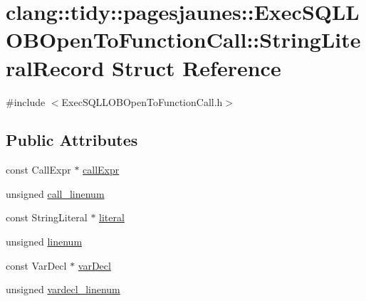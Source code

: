 \hypertarget{structclang_1_1tidy_1_1pagesjaunes_1_1_exec_s_q_l_l_o_b_open_to_function_call_1_1_string_literal_record}{}\section{clang\+:\+:tidy\+:\+:pagesjaunes\+:\+:Exec\+S\+Q\+L\+L\+O\+B\+Open\+To\+Function\+Call\+:\+:String\+Literal\+Record Struct Reference}
\label{structclang_1_1tidy_1_1pagesjaunes_1_1_exec_s_q_l_l_o_b_open_to_function_call_1_1_string_literal_record}


{\ttfamily \#include $<$Exec\+S\+Q\+L\+L\+O\+B\+Open\+To\+Function\+Call.\+h$>$}

\subsection*{Public Attributes}
\begin{DoxyCompactItemize}
\item 
const Call\+Expr $\ast$ \hyperlink{structclang_1_1tidy_1_1pagesjaunes_1_1_exec_s_q_l_l_o_b_open_to_function_call_1_1_string_literal_record_a19dd99a938d1c82840ac608060ea6ddd}{call\+Expr}
\item 
unsigned \hyperlink{structclang_1_1tidy_1_1pagesjaunes_1_1_exec_s_q_l_l_o_b_open_to_function_call_1_1_string_literal_record_a31d5470ad81230fa720932dc0d3f231c}{call\+\_\+linenum}
\item 
const String\+Literal $\ast$ \hyperlink{structclang_1_1tidy_1_1pagesjaunes_1_1_exec_s_q_l_l_o_b_open_to_function_call_1_1_string_literal_record_a3a954eb842c9a047d3a6a14bb2feeb15}{literal}
\item 
unsigned \hyperlink{structclang_1_1tidy_1_1pagesjaunes_1_1_exec_s_q_l_l_o_b_open_to_function_call_1_1_string_literal_record_a209043197ff1317a254545f79c9ac964}{linenum}
\item 
const Var\+Decl $\ast$ \hyperlink{structclang_1_1tidy_1_1pagesjaunes_1_1_exec_s_q_l_l_o_b_open_to_function_call_1_1_string_literal_record_ad8874312a239287d9173f41d5f289afb}{var\+Decl}
\item 
unsigned \hyperlink{structclang_1_1tidy_1_1pagesjaunes_1_1_exec_s_q_l_l_o_b_open_to_function_call_1_1_string_literal_record_a9d788405a2558fb61889746fe060570f}{vardecl\+\_\+linenum}
\end{DoxyCompactItemize}


